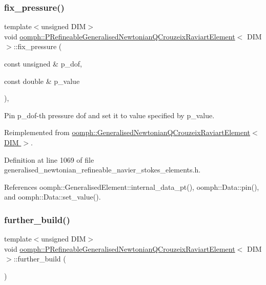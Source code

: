 \subsubsection{\texorpdfstring{fix\+\_\+pressure()}{fix\_pressure()}}
{\footnotesize\ttfamily template$<$unsigned D\+IM$>$ \\
void \hyperlink{classoomph_1_1PRefineableGeneralisedNewtonianQCrouzeixRaviartElement}{oomph\+::\+P\+Refineable\+Generalised\+Newtonian\+Q\+Crouzeix\+Raviart\+Element}$<$ D\+IM $>$\+::fix\+\_\+pressure (\begin{DoxyParamCaption}\item[{const unsigned \&}]{p\+\_\+dof,  }\item[{const double \&}]{p\+\_\+value }\end{DoxyParamCaption})\hspace{0.3cm}{\ttfamily [inline]}, {\ttfamily [virtual]}}



Pin p\+\_\+dof-\/th pressure dof and set it to value specified by p\+\_\+value. 



Reimplemented from \hyperlink{classoomph_1_1GeneralisedNewtonianQCrouzeixRaviartElement_abbd85f033c570ea3d4e4033639436998}{oomph\+::\+Generalised\+Newtonian\+Q\+Crouzeix\+Raviart\+Element$<$ D\+I\+M $>$}.



Definition at line 1069 of file generalised\+\_\+newtonian\+\_\+refineable\+\_\+navier\+\_\+stokes\+\_\+elements.\+h.



References oomph\+::\+Generalised\+Element\+::internal\+\_\+data\+\_\+pt(), oomph\+::\+Data\+::pin(), and oomph\+::\+Data\+::set\+\_\+value().

\mbox{\label{classoomph_1_1PRefineableGeneralisedNewtonianQCrouzeixRaviartElement_a4036689a0d7a43ab7f3bbb18204ec404}} 
\subsubsection{\texorpdfstring{further\+\_\+build()}{further\_build()}\hspace{0.1cm}{\footnotesize\ttfamily [1/3]}}
{\footnotesize\ttfamily template$<$unsigned D\+IM$>$ \\
void \hyperlink{classoomph_1_1PRefineableGeneralisedNewtonianQCrouzeixRaviartElement}{oomph\+::\+P\+Refineable\+Generalised\+Newtonian\+Q\+Crouzeix\+Raviart\+Element}$<$ D\+IM $>$\+::further\+\_\+build (\begin{DoxyParamCaption}{ }\end{DoxyParamCaption})\hspace{0.3cm}{\ttfamily [virtual]}}

